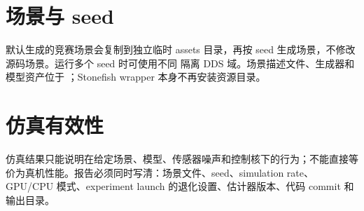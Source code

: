 \section{场景与 seed}
默认生成的竞赛场景会复制到独立临时 assets 目录，再按 seed 生成场景，不修改源码场景。运行多个 seed 时可使用不同  隔离 DDS 域。场景描述文件、生成器和模型资产位于 ；Stonefish wrapper 本身不再安装资源目录。

\section{仿真有效性}
仿真结果只能说明在给定场景、模型、传感器噪声和控制核下的行为；不能直接等价为真机性能。报告必须同时写清：场景文件、seed、simulation rate、GPU/CPU 模式、experiment launch 的退化设置、估计器版本、代码 commit 和输出目录。
